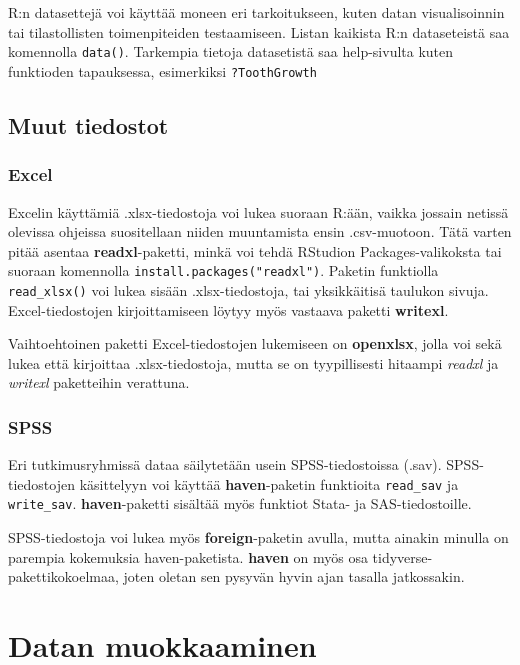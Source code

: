 \documentclass[
]{book}
\begin{document}
R:n datasettejä voi käyttää moneen eri tarkoitukseen, kuten datan visualisoinnin tai tilastollisten toimenpiteiden testaamiseen. Listan kaikista R:n dataseteistä saa komennolla \texttt{data()}. Tarkempia tietoja datasetistä saa help-sivulta kuten funktioden tapauksessa, esimerkiksi \texttt{?ToothGrowth}

\hypertarget{muut-tiedostot}{%
\section{Muut tiedostot}\label{muut-tiedostot}}

\hypertarget{excel}{%
\subsection{Excel}\label{excel}}

Excelin käyttämiä .xlsx-tiedostoja voi lukea suoraan R:ään, vaikka jossain netissä olevissa ohjeissa suositellaan niiden muuntamista ensin .csv-muotoon. Tätä varten pitää asentaa \textbf{readxl}-paketti, minkä voi tehdä RStudion Packages-valikoksta tai suoraan komennolla \texttt{install.packages("readxl")}. Paketin funktiolla \texttt{read\_xlsx()} voi lukea sisään .xlsx-tiedostoja, tai yksikkäitisä taulukon sivuja. Excel-tiedostojen kirjoittamiseen löytyy myös vastaava paketti \textbf{writexl}.

Vaihtoehtoinen paketti Excel-tiedostojen lukemiseen on \textbf{openxlsx}, jolla voi sekä lukea että kirjoittaa .xlsx-tiedostoja, mutta se on tyypillisesti hitaampi \emph{readxl} ja \emph{writexl} paketteihin verattuna.

\hypertarget{spss}{%
\subsection{SPSS}\label{spss}}

Eri tutkimusryhmissä dataa säilytetään usein SPSS-tiedostoissa (.sav). SPSS-tiedostojen käsittelyyn voi käyttää \textbf{haven}-paketin funktioita \texttt{read\_sav} ja \texttt{write\_sav}. \textbf{haven}-paketti sisältää myös funktiot Stata- ja SAS-tiedostoille.

SPSS-tiedostoja voi lukea myös \textbf{foreign}-paketin avulla, mutta ainakin minulla on parempia kokemuksia haven-paketista. \textbf{haven} on myös osa tidyverse-pakettikokoelmaa, joten oletan sen pysyvän hyvin ajan tasalla jatkossakin.

\hypertarget{data-wrangling}{%
\chapter{Datan muokkaaminen}\label{data-wrangling}}
\end{document}
